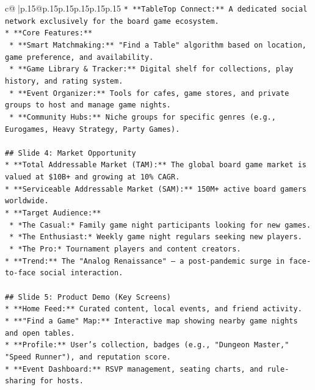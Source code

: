 \documentclass{article}
\begin{document}
{\begin{supertabular}{c@{$\;$}|p{.15\linewidth}@{}p{.15\linewidth}p{.15\linewidth}p{.15\linewidth}p{.15\linewidth}p{.15\linewidth}}
{{{\texttt{*   **TableTop Connect:** A dedicated social network exclusively for the board game ecosystem.} \\
\texttt{*   **Core Features:**} \\
\texttt{    *   **Smart Matchmaking:** "Find a Table" algorithm based on location, game preference, and availability.} \\
\texttt{    *   **Game Library \& Tracker:** Digital shelf for collections, play history, and rating system.} \\
\texttt{    *   **Event Organizer:** Tools for cafes, game stores, and private groups to host and manage game nights.} \\
\texttt{    *   **Community Hubs:** Niche groups for specific genres (e.g., Eurogames, Heavy Strategy, Party Games).} \\
\\ 
\texttt{\#\# Slide 4: Market Opportunity} \\
\texttt{*   **Total Addressable Market (TAM):** The global board game market is valued at \$10B+ and growing at 10\% CAGR.} \\
\texttt{*   **Serviceable Addressable Market (SAM):** 150M+ active board gamers worldwide.} \\
\texttt{*   **Target Audience:**} \\
\texttt{    *   *The Casual:* Family game night participants looking for new games.} \\
\texttt{    *   *The Enthusiast:* Weekly game night regulars seeking new players.} \\
\texttt{    *   *The Pro:* Tournament players and content creators.} \\
\texttt{*   **Trend:** The "Analog Renaissance" – a post{-}pandemic surge in face{-}to{-}face social interaction.} \\
\\ 
\texttt{\#\# Slide 5: Product Demo (Key Screens)} \\
\texttt{*   **Home Feed:** Curated content, local events, and friend activity.} \\
\texttt{*   **"Find a Game" Map:** Interactive map showing nearby game nights and open tables.} \\
\texttt{*   **Profile:** User's collection, badges (e.g., "Dungeon Master," "Speed Runner"), and reputation score.} \\
\texttt{*   **Event Dashboard:** RSVP management, seating charts, and rule{-}sharing for hosts.} \\
\\ 
}}}
\end{supertabular}}
\end{document}
